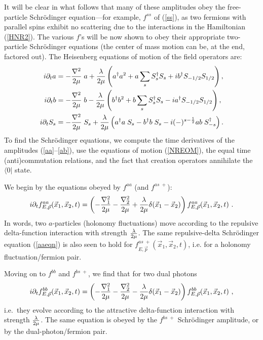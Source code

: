 \documentclass[11pt]{article}
\begin{document}
It will be clear in what follows that many of these amplitudes obey the free-particle Schr\" odinger equation---for example, $f^{ss}$ of (\ref{ss}), as two fermions with parallel spins exhibit no scattering due to the interactions in the Hamiltonian (\ref{HNR2}). The various $f$'s will be now shown  to obey their appropriate two-particle Schr\" odinger equations (the center of mass motion can be, at the end, factored out).  
The Heisenberg equations of motion of the  field operators are:
 \begin{align}
 \label{NREOM}
 i \partial_t a &= -{\nabla^2 \over 2\mu} \; a+{\lambda \over 2\mu}\left(a^\dagger a^2 + a \sum\limits_s S_s^\dagger S_s + i b^\dagger S_{-1/2} S_{1/2} \right) ,\nonumber \\
  i \partial_t b &= -{\nabla^2 \over 2\mu} \; b -{\lambda \over 2\mu}\left(b^\dagger b^2 + b \sum\limits_s S_s^\dagger S_s - i a^\dagger S_{-1/2} S_{1/2} \right) , \\
   i \partial_t S_s &= -{\nabla^2 \over 2\mu} \; S_s+{\lambda \over 2\mu}\left(a^\dagger a \;S_s - b^\dagger b \; S_s - i (-)^{s-{1\over 2}} a b \; S_{-s}^\dagger  \right)\nonumber .
 \end{align}
To find the Schr\" odinger equations, we compute the time derivatives of the amplitudes (\ref{aa}--\ref{ab}), use the equations of motion (\ref{NREOM}), the equal time (anti)commutation relations, and the fact that creation operators annihilate the $\langle 0|$ state. 
 
We begin by the equations obeyed by $f^{aa}$ (and $f^{as \; +}$):
  \begin{equation}
  \label{aaeqn}
  i \partial_t f^{aa}_{E,\vec{p}}(\vec{x}_1,\vec{x}_2,t) = \left(- {\nabla_1^2 \over 2 \mu} - {\nabla_2^2 \over 2 \mu} + {\lambda \over 2 \mu} \delta(\vec{x}_1 - \vec{x}_2)\right) f^{aa}_{E,\vec{p}}(\vec{x}_1,\vec{x}_2,t)~.
  \end{equation}
In  words, two $a$-particles (holonomy fluctuations) move according to the repulsive delta-function interaction with strength $\lambda \over 2 \mu$. The same repulsive-delta Schr\" odinger equation (\ref{aaeqn}) is also seen  to hold for $f^{as \; +}_{E,\vec{p}}(\vec{x}_1,\vec{x}_2,t)$, i.e. for a holonomy fluctuation/fermion pair.
  
Moving on to $f^{bb}$ and $f^{bs \; +}$, we find that for two dual photons 
  \begin{equation}
  \label{bbeqn}
  i \partial_t f^{bb}_{E,\vec{p}}(\vec{x}_1,\vec{x}_2,t) = \left(- {\nabla_1^2 \over 2 \mu} - {\nabla_2^2 \over 2 \mu} - {\lambda \over 2 \mu} \delta(\vec{x}_1 - \vec{x}_2)\right)  f^{bb}_{E,\vec{p}}(\vec{x}_1,\vec{x}_2,t)~,
  \end{equation}
  i.e.~they evolve according to the attractive delta-function interaction with strength $\lambda \over 2 \mu$. The same equation is obeyed by the $f^{bs \; +}$ Schr\" odinger amplitude, or by the dual-photon/fermion pair. 
  
\end{document}
